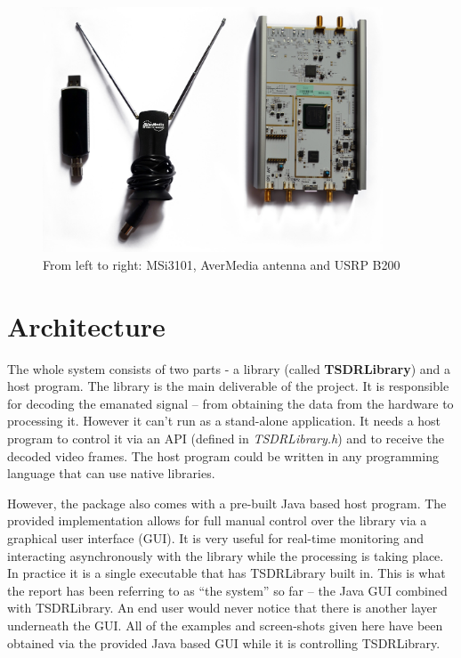 \documentclass[a4paper,12pt,twoside,openright]{report}
\begin{document}
\begin{figure}[h!]
 
  \centering
    \includegraphics[width=0.9\textwidth]{equipment}
    \caption{From left to right: MSi3101, AverMedia antenna and USRP B200}
\end{figure}


\section{Architecture}

The whole system consists of two parts - a library (called \textbf{TSDRLibrary}) and a host program. The library is the main deliverable of the project. It is responsible for decoding the emanated signal -- from obtaining the data from the hardware to processing it. However it can't run as a stand-alone application. It needs a host program to control it via an API (defined in \textit{TSDRLibrary.h}) and to receive the decoded video frames. The host program could be written in any programming language that can use native libraries.

However, the package also comes with a pre-built Java based host program. The provided implementation allows for full manual control over the library via a graphical user interface (GUI). It is very useful for real-time monitoring and interacting asynchronously with the library while the processing is taking place. In practice it is a single executable that has TSDRLibrary built in. This is what the report has been referring to as ``the system'' so far -- the Java GUI combined with TSDRLibrary. An end user would never notice that there is another layer underneath the GUI. All of the examples and screen-shots given here have been obtained via the provided Java based GUI while it is controlling TSDRLibrary.
\end{document}

